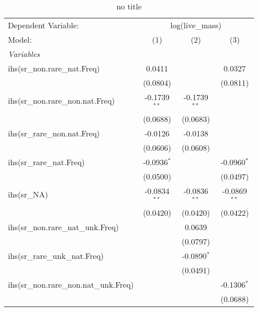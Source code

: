 
\begin{table}[htbp]
   \caption{no title}
   \centering
   \begin{tabular}{lccc}
      \tabularnewline \midrule \midrule
      Dependent Variable: & \multicolumn{3}{c}{log(live\_mass)}\\
      Model:                                  & (1)            & (2)            & (3)\\  
      \midrule
      \emph{Variables}\\
      ihs(sr\_non.rare\_nat.Freq)             & 0.0411         &                & 0.0327\\   
                                              & (0.0804)       &                & (0.0811)\\   
      ihs(sr\_non.rare\_non.nat.Freq)         & -0.1739$^{**}$ & -0.1739$^{**}$ &   \\   
                                              & (0.0688)       & (0.0683)       &   \\   
      ihs(sr\_rare\_non.nat.Freq)             & -0.0126        & -0.0138        &   \\   
                                              & (0.0606)       & (0.0608)       &   \\   
      ihs(sr\_rare\_nat.Freq)                 & -0.0936$^{*}$  &                & -0.0960$^{*}$\\   
                                              & (0.0500)       &                & (0.0497)\\   
      ihs(sr\_NA)                             & -0.0834$^{**}$ & -0.0836$^{**}$ & -0.0869$^{**}$\\   
                                              & (0.0420)       & (0.0420)       & (0.0422)\\   
      ihs(sr\_non.rare\_nat\_unk.Freq)        &                & 0.0639         &   \\   
                                              &                & (0.0797)       &   \\   
      ihs(sr\_rare\_unk\_nat.Freq)            &                & -0.0890$^{*}$  &   \\   
                                              &                & (0.0491)       &   \\   
      ihs(sr\_non.rare\_non.nat\_unk.Freq)    &                &                & -0.1306$^{*}$\\   
                                              &                &                & (0.0688)\\   

\end{tabular}
\end{table}
